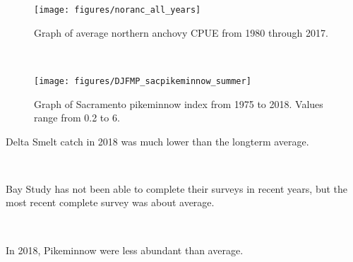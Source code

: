 \documentclass[
]{book}
\begin{document}
\begin{panel-grid}
\begin{columns-nocenter}
\begin{column800}
\begin{expand}
\begin{figure}
\texttt{[image: figures/noranc\_all\_years]} \caption{Graph of average northern anchovy CPUE from 1980 through 2017.}\label{fig:unnamed-chunk-80}
\end{figure}

\end{expand}

\end{column800}

\begin{column40}

~

\end{column40}

\begin{column800}

\begin{expand}

\begin{figure}
\texttt{[image: figures/DJFMP\_sacpikeminnow\_summer]} \caption{Graph of Sacramento pikeminnow index from 1975 to 2018. Values range from 0.2 to 6.}\label{fig:unnamed-chunk-81}
\end{figure}

\end{expand}

\end{column800}

\end{columns-nocenter}

\begin{columns-nocenter}

\begin{column800}

Delta Smelt catch in 2018 was much lower than the longterm average.

\end{column800}

\begin{column40}

~

\end{column40}

\begin{column800}

Bay Study has not been able to complete their surveys in recent years, but the most recent complete survey was about average.

\end{column800}

\begin{column40}

~

\end{column40}

\begin{column800}

In 2018, Pikeminnow were less abundant than average.

\end{column800}

\end{columns-nocenter}

\end{panel-grid}
\end{document}
